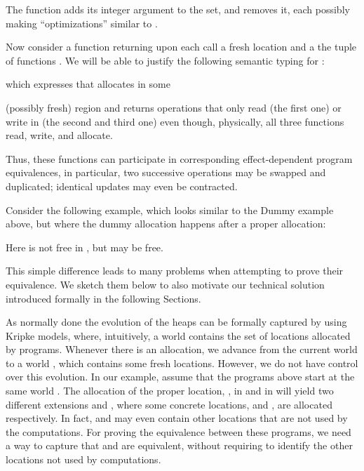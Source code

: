 \documentclass[orivec]{llncs}
\newif\iffull\fullfalse
\renewcommand{\paragraph}[1]{\noindent {\bf #1}}
\begin{document}
The function  adds its integer argument to the
set, and  removes it, each possibly making
``optimizations'' similar to .

Now consider a function  returning upon each call
a fresh location  and a the tuple of functions
.
We will be able to justify the following
 semantic typing for : 
\iffull

which  expresses   that    allocates   in  some
\else



\noindent
which  expresses   that    allocates   in  some
\fi
(possibly fresh) region  and returns operations that only read
 (the  first one)  or write  in  (the  second and
third one)  even though, physically, all three  functions read, write,
and allocate.


Thus, these functions can participate in corresponding
effect-dependent program equivalences, in particular, two successive
 operations may be swapped and duplicated; identical
updates may even be contracted.
\iffull\footnote{We
could
also consider a more object-oriented variant that works with
a basic type  accepted as argument by the
operations.}
\fi

\paragraph{Interleaved Dummy allocation}
Consider the following example, which looks similar to the Dummy example
above, but where the dummy allocation happens after a proper allocation:
\iffull

Here  is not free in , but  may be free.
\else



\noindent
Here  is not free in , but  may be free.
\fi
This simple difference leads to many problems when 
attempting to prove
their equivalence. We sketch them below to also motivate
our technical solution introduced formally in the following Sections. 

As normally done the
evolution of the heaps can be formally captured by using Kripke models,
where, intuitively, a world contains the set of locations allocated by
programs.
Whenever there is an allocation,
we advance from the current world  to a world , which contains
some fresh locations. However, we do not have control over this
evolution. In our example, assume that the programs above
start at the same world . The allocation of the proper location,
,
in  and in  will yield two different extensions  and
, where some concrete locations,  and , are
allocated respectively. In fact,  and  may even contain other
locations that are not used by the computations. For proving the
equivalence between these programs, we need
a way to capture that   and  are equivalent, without
requiring to identify the other locations not used by computations.
\end{document}
